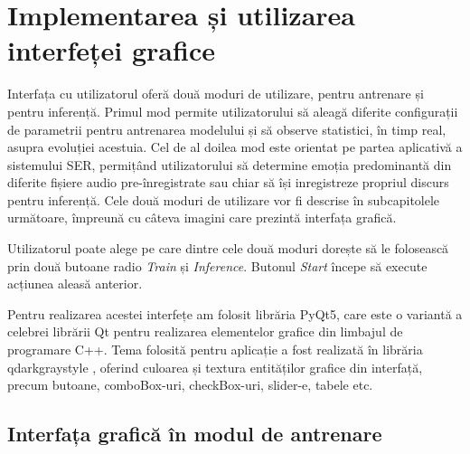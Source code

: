 \documentclass[a4paper,12pt]{book}
\begin{document}
	\section{Implementarea și utilizarea interfeței grafice}
		Interfața cu utilizatorul oferă două moduri de utilizare, pentru antrenare și pentru inferență. Primul mod permite utilizatorului să aleagă diferite configurații de parametrii pentru antrenarea modelului și să observe statistici, în timp real, asupra evoluției acestuia. Cel de al doilea mod este orientat pe partea aplicativă a sistemului SER, permițând utilizatorului să determine emoția predominantă din diferite fișiere audio pre-înregistrate sau chiar să își inregistreze propriul discurs pentru inferență. Cele două moduri de utilizare vor fi descrise în subcapitolele următoare, împreună cu câteva imagini care prezintă interfața grafică. \par 
		Utilizatorul poate alege pe care dintre cele două moduri dorește să le folosească prin două butoane radio \textit{Train} și \textit{Inference}. Butonul \textit{Start} începe să execute acțiunea aleasă anterior. \par
		
		Pentru realizarea acestei interfețe am folosit librăria PyQt5, care este o variantă a celebrei librării Qt pentru realizarea elementelor grafice din limbajul de programare C++. Tema folosită pentru aplicație a fost realizată în librăria qdarkgraystyle \cite{qdarkgraystyle}, oferind culoarea și textura entităților grafice din interfață, precum butoane, comboBox-uri, checkBox-uri, slider-e, tabele  etc. 
		
		\subsection{Interfața grafică în modul de antrenare} \label{guiAntrenare}
		
\end{document}
